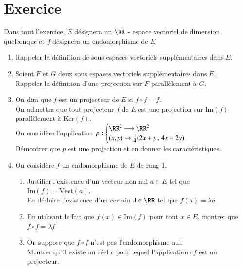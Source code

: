 \documentclass[oneside,12pt]{article}
\renewcommand\ker{%
        {\mathrm{Ker}}}
\newcommand\im{%
        {\mathrm{Im}}}
\begin{document}
\section*{Exercice}
Dans tout l'exercice, $E$ désignera un $\RR$ - espace vectoriel de dimension quelconque et $f$ désignera un endomorphisme de $E$
\begin{enumerate}
	\item Rappeler la définition de sous espaces vectoriels supplémentaires dans $E$.
	\item Soient $F$ et $G$ deux sous espaces vectoriels supplémentaires dans $E$.\\
	Rappeler la définition d'une projection sur $F$ parallèlement à $G$.
	\item On dira que $f$ est un projecteur de $E$ si $f \circ f = f$.\\
	On admettra que tout projecteur $f$ de $E$ est une projection sur $\im(f)$ parallèlement à $\ker(f)$. \\
	On considère l'application $p:\begin{cases} \RR^2 \longrightarrow \RR^2 \\ (x,y) \mapsto \frac{1}{4}(2x+y\, , \, 4x+2y) \end{cases}$ \\
	Démontrer que $p$ est une projection et en donner les caractéristiques.
	\item On considère $f$ un endomorphisme de $E$ de rang 1.
	\begin{enumerate}
		\item Justifier l'existence d'un vecteur non nul $a\in E$ tel que $\im(f)=\mathrm{Vect}(a)$.\\
		En déduire l'existence d'un certain $\lambda\in\RR$ tel que $f(a)=\lambda a$
		\item En utilisant le fait que $f(x)\in \im(f)$ pour tout $x\in E$, montrer que $f \circ f = \lambda f$
		\item On suppose que $f \circ f$ n'est pas l'endomorphisme nul. \\
		Montrer qu'il existe un réel $c$ pour lequel l'application $cf$ est un projecteur.
	\end{enumerate}
\end{enumerate}

\vspace{25mm}
\end{document}
